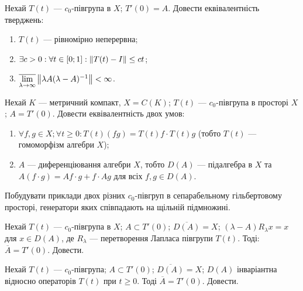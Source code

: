 
\begin{exercise}
    Нехай $T(t)$ --- $c_0$-півгрупа в $X$; $T'(0) = A$. Довести еквівалентність тверджень:
    \begin{enumerate}
        \item $T(t)$ --- рівномірно неперервна;
        \item $\exists c > 0: \forall t \in [0; 1]: \left\lVert T(t) - I\right\rVert \leq ct$;
        \item $\overline{\lim\limits_{\lambda \rightarrow \infty}} \left\lVert\lambda A (\lambda - A)^{-1}\right\rVert < \infty$.
    \end{enumerate}
\end{exercise}

\begin{exercise}
    Нехай $K$ --- метричний компакт, $X = C(K)$; $T(t)$ --- $c_0$-півгрупа в просторі $X$; 
    $A = T'(0)$. Довести еквівалентність двох умов:
    \begin{enumerate}
        \item $\forall f, g \in X; \forall t \geq 0: T(t)(fg) = T(t)f \cdot T(t)g$
        (тобто $T(t)$ --- гомоморфізм алгебри $X$);
        \item $A$ --- диференціювання алгебри $X$, тобто $D(A)$ --- підалгебра в $X$
        та $A(f \cdot g) = Af \cdot g + f \cdot Ag$ для всіх $f, g \in D(A)$.
    \end{enumerate}
\end{exercise}

\begin{exercise}
    Побудувати приклади двох різних $c_0$-півгруп в сепарабельному гільбертовому просторі, 
    генератори яких співпадають на щільній підмножині.
\end{exercise}

\begin{exercise}
    Нехай $T(t)$ --- $c_0$-півгрупа в $X$; $A \subset T' (0)$; $\overline{D(A)} = X$; 
    $(\lambda - A)R_{\lambda}x = x$ для $x \in D(A)$, де $R_{\lambda}$ --- перетворення Лапласа півгрупи $T(t)$.
    Тоді: $\overline{A} = T'(0)$. Довести.
\end{exercise}

\begin{exercise}
    Нехай $T(t)$ --- $c_0$-півгрупа; $A \subset T'(0)$; $\overline{D(A)} = X$; 
    $D(A)$ інваріантна відносно операторів $T(t)$ при $t \geq 0$. Тоді $\overline{A} = T'(0)$. Довести.
\end{exercise}